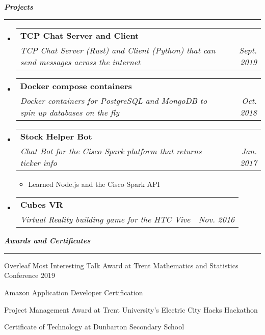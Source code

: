 \documentclass[letterpaper,11pt]{article}
\makeatletter
\newcommand{\resitem}[1]{\item #1 \vspace{-2pt}}
\newcommand{\mysection}[1]{\vspace{5pt} {\bfseries \textsl{#1}} \\ {\color{gray} \rule[5pt]{\textwidth}{1pt}}}
\newcommand{\ressubheading}[4]{\begin{tabular*}{6.5in}{l@{\extracolsep{\fill}}r}
        \textbf{#1} & #2 \\
        \textit{#3} & \textit{#4} \\
\end{tabular*}\vspace{-6pt}}
\makeatother
\begin{document}
\mysection{Projects}
\begin{itemize}
    \item
        \ressubheading{TCP Chat Server and Client}{}{TCP Chat Server (Rust) and
        Client (Python) that can send messages across the internet}{Sept. 2019}
    \item
        \ressubheading{Docker compose containers}{}{Docker containers for PostgreSQL and MongoDB to spin up databases on the fly}{Oct. 2018}
    \item
        \ressubheading{Stock Helper Bot}{}{Chat Bot for the Cisco Spark platform that returns ticker info}{Jan. 2017}
        \begin{itemize}
                \resitem{Learned Node.js and the Cisco Spark API}
        \end{itemize}
    \item
        \ressubheading{Cubes VR}{}{Virtual Reality building game for the HTC Vive}{Nov. 2016}

\end{itemize}

\mysection{Awards and Certificates}
\begin{description}
    \item Overleaf Most Interesting Talk Award at Trent Mathematics and Statistics Conference 2019
    \item Amazon Application Developer Certification
    \item Project Management Award at Trent University's Electric City Hacks Hackathon
    \item Certificate of Technology at Dunbarton Secondary School
\end{description}
\end{document}
